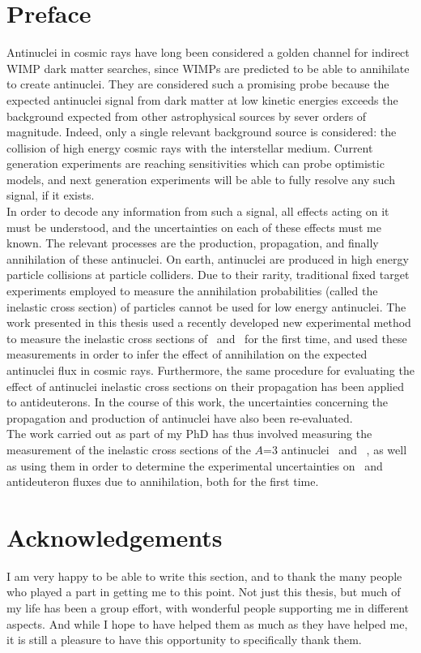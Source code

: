 \section*{Preface}\label{sec:preface_en}

Antinuclei in cosmic rays have long been considered a golden channel for indirect WIMP dark matter searches, since WIMPs are predicted to be able to annihilate to create antinuclei. They are considered such a promising probe because the expected antinuclei signal from dark matter at low kinetic energies exceeds the background expected from other astrophysical sources by sever orders of magnitude. Indeed, only a single relevant background source is considered: the collision of high energy cosmic rays with the interstellar medium. Current generation experiments are reaching sensitivities which can probe optimistic models, and next generation experiments will be able to fully resolve any such signal, if it exists. \\
In order to decode any information from such a signal, all effects acting on it must be understood, and the uncertainties on each of these effects must me known. The relevant processes are the production, propagation, and finally annihilation of these antinuclei. On earth, antinuclei are produced in high energy particle collisions at particle colliders. Due to their rarity, traditional fixed target experiments employed to measure the annihilation probabilities (called the inelastic cross section) of particles cannot be used for low energy antinuclei. The work presented in this thesis used a recently developed new experimental method to measure the inelastic cross sections of \ahe\ and \atrit\ for the first time, and used these measurements in order to infer the effect of annihilation on the expected antinuclei flux in cosmic rays. Furthermore, the same procedure for evaluating the effect of antinuclei inelastic cross sections on their propagation has been applied to antideuterons. In the course of this work, the uncertainties concerning the propagation and production of antinuclei have also been re-evaluated. \\
The work carried out as part of my PhD has thus involved measuring the measurement of the inelastic cross sections of the $A$=3 antinuclei \ahe\ and \atrit\ , as well as using them in order to determine the experimental uncertainties on \ahe\ and antideuteron fluxes due to annihilation, both for the first time. 

\newpage

\section*{Acknowledgements}
I am very happy to be able to write this section, and to thank the many people who played a part in getting me to this point. Not just this thesis, but much of my life has been a group effort, with wonderful people supporting me in different aspects. And while I hope to have helped them as much as they have helped me, it is still a pleasure to have this opportunity to specifically thank them. \\

